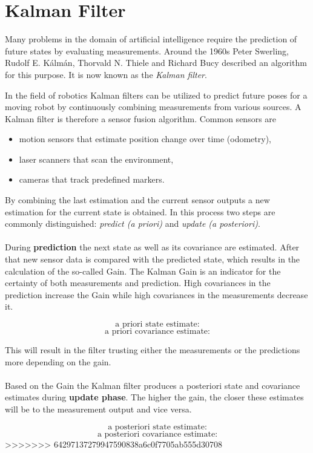 \section{Kalman Filter}
Many problems in the domain of artificial intelligence require the prediction of future states by evaluating measurements. Around the 1960s Peter Swerling, Rudolf E. Kálmán, Thorvald N. Thiele and Richard Bucy described an algorithm for this purpose. It is now known as the \textit{Kalman filter}.

In the field of robotics Kalman filters can be utilized to predict future poses for a moving robot by continuously combining measurements from various sources. A Kalman filter is therefore a sensor fusion algorithm. Common sensors are
 
\begin{itemize}
\item motion sensors that estimate position change over time (odometry),
\item laser scanners that scan the environment,
\item cameras that track predefined markers. 
\end{itemize}

By combining the last estimation and the current sensor outputs a new estimation for the current state is obtained. In this process two steps are commonly distinguished: \textit{predict (a priori)} and \textit{update (a posteriori)}.
\\\\
During \textbf{prediction} the next state as well as its covariance are estimated. After that new sensor data is compared with the predicted state, which results in the calculation of the so-called  Gain. The Kalman Gain is an indicator for the certainty of both measurements and prediction. High covariances in the prediction increase the Gain while high covariances in the measurements decrease it.

$$\text{a priori state estimate:} $$
$$\text{a priori covariance estimate:} $$

This will result in the filter trusting either the measurements or the predictions more depending on the gain. 
\\\\
Based on the Gain the Kalman filter produces a posteriori state and covariance estimates during \textbf{update phase}. The higher the gain, the closer these estimates will be to the measurement output and vice versa.

$$\text{a posteriori state estimate:} $$
$$\text{a posteriori covariance estimate:} $$
>>>>>>> 64297137279947590838a6c0f7705ab555d30708
